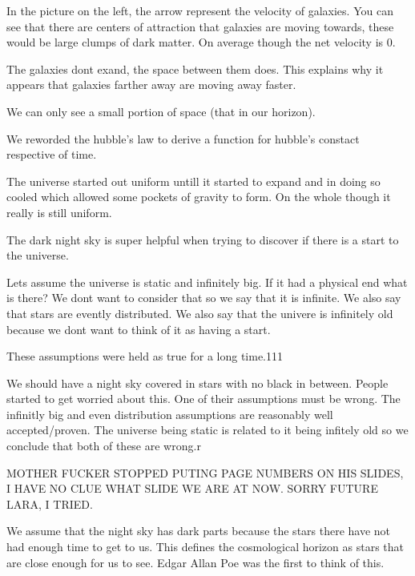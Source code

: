 \documentclass{article}
\begin{document}

In the picture on the left, the arrow represent the velocity of galaxies. You can see that there are centers of attraction that galaxies are moving towards, these would be large clumps of dark matter. On average though the net velocity is 0.


The galaxies dont exand, the space between them does. This explains why it appears that galaxies farther away are moving away faster.


We can only see a small portion of space (that in our horizon).


We reworded the hubble's law to derive a function for hubble's constact respective of time.


The universe started out uniform untill it started to expand and in doing so cooled which allowed some pockets of gravity to form. On the whole though it really is still uniform.



The dark night sky is super helpful when trying to discover if there is a start to the universe.

Lets assume the universe is static and infinitely big. If it had a physical end what is there? We dont want to consider that so we say that it is infinite. We also say that stars are evently distributed. We also say that the univere is infinitely old because we dont want to think of it as having a start.

These assumptions were held as true for a long time.111

We should have a night sky covered in stars with no black in between. People started to get worried about this. One of their assumptions must be wrong. The infinitly big and even distribution assumptions are reasonably well accepted/proven. The universe being static is related to it being infitely old so we conclude that both of these are wrong.r

MOTHER FUCKER STOPPED PUTING PAGE NUMBERS ON HIS SLIDES, I HAVE NO CLUE WHAT SLIDE WE ARE AT NOW. SORRY FUTURE LARA, I TRIED.

We assume that the night sky has dark parts because the stars there have not had enough time to get to us. This defines the cosmological horizon as stars that are close enough for us to see. Edgar Allan Poe was the first to think of this.
\end{document}
